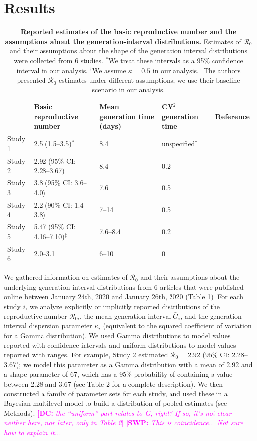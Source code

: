 \documentclass[12pt]{article}
\newcommand{\Rx}[1]{\ensuremath{{\mathcal R}_{#1}}}
\newcommand{\Ro}{\Rx{0}\xspace}
\newcommand{\comment}[3]{\textcolor{#1}{\textbf{[#2: }\textsl{#3}\textbf{]}}}
\newcommand{\swp}[1]{\comment{magenta}{SWP}{#1}}
\newcommand{\dc}[1]{\comment{magenta}{DC}{#1}}
\begin{document}
\section{Results}

\begin{table}[t]
\begin{center}
\scriptsize
\begin{tabular}{l|l|l|l|c}
 & Basic reproductive number & Mean generation time (days) & CV$^2$ generation time & Reference \\
\hline
Study 1 & 2.5 (1.5--3.5)$^\ast$ & 8.4 & unspecified$^\dagger$ & \cite{imaincov} \\
\hline
Study 2 & 2.92 (95\% CI: 2.28--3.67) & 8.4 & 0.2 & \cite{liuncov} \\
\hline
Study 3 & 3.8 (95\% CI: 3.6--4.0) & 7.6 & 0.5 & \cite{readncov} \\
\hline
Study 4 & 2.2 (90\% CI: 1.4--3.8) & 7--14 & 0.5 & \cite{riouncov} \\
\hline
Study 5 & 5.47 (95\% CI: 4.16--7.10)$^\ddagger$ & 7.6--8.4 & 0.2 & \cite{zhaoncov} \\
\hline
Study 6 & 2.0--3.1 & 6--10 & 0 & \cite{majumderncov} \\
\hline
\end{tabular}
\end{center}
\caption{
\textbf{Reported estimates of the basic reproductive number and the assumptions about the generation-interval distributions.}
Estimates of \Ro and their assumptions about the shape of the generation interval distributions were collected from 6 studies.
$^\ast$We treat these intervals as a 95\% confidence interval in our analysis.
$^\dagger$We assume $\kappa = 0.5$ in our analysis.
$^\ddagger$The authors presented \Ro estimates under different assumptions; we use their baseline scenario in our analysis.
}
\end{table}

We gathered information on estimates of \Ro and their assumptions about the underlying generation-interval distributions from 6 articles that were published online between January 24th, 2020 and January 26th, 2020 (Table 1).
For each study $i$, we analyze explicitly or implicitly reported distributions of the reproductive number $\mathcal R_{0i}$, the mean generation interval $\bar G_i$, and the generation-interval dispersion parameter $\kappa_i$ (equivalent to the squared coefficient of variation for a Gamma distribution).
We used Gamma distributions to model values reported with confidence intervals and uniform distributions to model values reported with ranges.
For example, Study 2 estimated $\Ro = 2.92$ (95\% CI: 2.28--3.67);
we model this parameter as a Gamma distribution with a mean of 2.92 and a shape parameter of 67, which has a 95\% probability of containing a value between 2.28 and 3.67 (see Table 2 for a complete description).
We then constructed a family of parameter sets for each study, and used these in a Bayesian multilevel model to build a distribution of pooled estimates (see Methods).
\dc{the “uniform” part relates to G, right? If so, it’s not clear
neither here, nor later, only in Table 2}
\swp{This is coincidence... Not sure how to explain it...}
\end{document}
